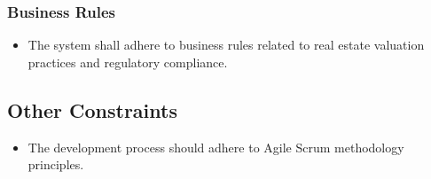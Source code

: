 \documentclass[12pt]{article}
\begin{document}
\subsubsection{Business Rules}
\begin{itemize}
    \item The system shall adhere to business rules related to real estate valuation practices and regulatory compliance.
\end{itemize}

\subsection{Other Constraints}
\begin{itemize}
    \item The development process should adhere to Agile Scrum methodology principles.
\end{itemize}
\newpage
\end{document}
